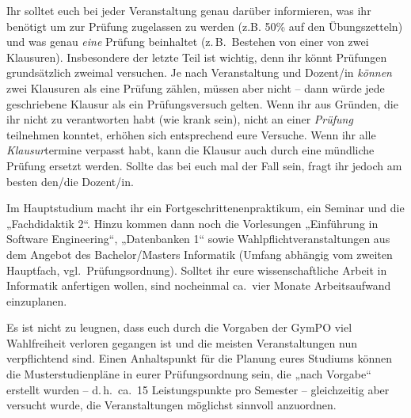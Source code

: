 Ihr solltet euch bei jeder Veranstaltung genau darüber informieren,
was ihr benötigt um zur Prüfung zugelassen zu werden (z.B. 50\% auf
den Übungszetteln) und was genau \emph{eine} Prüfung beinhaltet
(z.\,B.\ Bestehen von einer von zwei Klausuren). Insbesondere der
letzte Teil ist wichtig, denn ihr könnt Prüfungen grundsätzlich
zweimal versuchen. Je nach Veranstaltung und Dozent/in \emph{können}
zwei Klausuren als eine Prüfung zählen, müssen aber nicht -- dann
würde jede geschriebene Klausur als ein Prüfungsversuch gelten. Wenn
ihr aus Gründen, die ihr nicht zu verantworten habt (wie krank sein),
nicht an einer \emph{Prüfung} teilnehmen konntet, erhöhen sich
entsprechend eure Versuche. Wenn ihr alle \emph{Klausur}termine
verpasst habt, kann die Klausur auch durch eine mündliche Prüfung
ersetzt werden. Sollte das bei euch mal der Fall sein, fragt ihr
jedoch am besten den/die Dozent/in.

Im Hauptstudium macht ihr ein Fortgeschrittenenpraktikum, ein Seminar
und die „Fachdidaktik 2“.  Hinzu kommen dann noch die Vorlesungen
„Einführung in Software Engineering“, „Datenbanken 1“ sowie
Wahlpflichtveranstaltungen aus dem Angebot des Bachelor/Masters
Informatik (Umfang abhängig vom zweiten Hauptfach, vgl.\
Prüfungsordnung). Solltet ihr eure
wissenschaftliche Arbeit in Informatik anfertigen wollen, sind
nocheinmal ca.\ vier Monate Arbeitsaufwand einzuplanen.

Es ist nicht zu leugnen, dass euch durch die Vorgaben der \gls{GymPO}
viel Wahlfreiheit verloren gegangen ist und die meisten
Veranstaltungen nun verpflichtend sind. Einen Anhaltspunkt für die
Planung eures Studiums können die Musterstudienpläne in eurer
Prüfungsordnung sein, die „nach Vorgabe“ erstellt wurden -- d.\,h.\
ca.\ 15 Leistungspunkte pro Semester -- gleichzeitig aber versucht
wurde, die Veranstaltungen möglichst sinnvoll anzuordnen.
